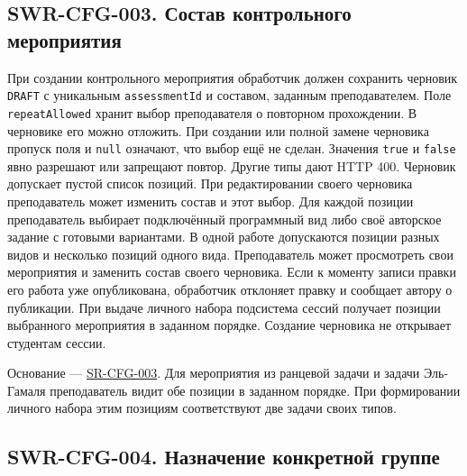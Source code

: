 \documentclass[12pt,a4paper]{article}
\begin{document}
\subsection{SWR-CFG-003. Состав контрольного мероприятия}\label{swr-cfg-003-ux441ux43eux441ux442ux430ux432-ux43aux43eux43dux442ux440ux43eux43bux44cux43dux43eux433ux43e-ux43cux435ux440ux43eux43fux440ux438ux44fux442ux438ux44f}

\hypertarget{swr-cfg-003-состав-контрольного-мероприятия}{}

\hypertarget{swr-cfg-003}{}

При создании контрольного мероприятия обработчик должен сохранить черновик \texttt{DRAFT} с уникальным \texttt{assessment\allowbreak{}Id} и составом, заданным преподавателем. Поле \texttt{repeat\allowbreak{}Allowed} хранит выбор преподавателя о повторном прохождении. В черновике его можно отложить. При создании или полной замене черновика пропуск поля и \texttt{null} означают, что выбор ещё не сделан. Значения \texttt{true} и \texttt{false} явно разрешают или запрещают повтор. Другие типы дают HTTP 400. Черновик допускает пустой список позиций. При редактировании своего черновика преподаватель может изменить состав и этот выбор. Для каждой позиции преподаватель выбирает подключённый программный вид либо своё авторское задание с готовыми вариантами. В одной работе допускаются позиции разных видов и несколько позиций одного вида. Преподаватель может просмотреть свои мероприятия и заменить состав своего черновика. Если к моменту записи правки его работа уже опубликована, обработчик отклоняет правку и сообщает автору о публикации. При выдаче личного набора подсистема сессий получает позиции выбранного мероприятия в заданном порядке. Создание черновика не открывает студентам сессии.

Основание --- {\href{../04\_Системные\_требования/DOC-05\_Системные\_требования.pdf\#sr-cfg-003}{SR-CFG-003}}. Для мероприятия из ранцевой задачи и задачи Эль-Гамаля преподаватель видит обе позиции в заданном порядке. При формировании личного набора этим позициям соответствуют две задачи своих типов.

\subsection{SWR-CFG-004. Назначение конкретной группе}\label{swr-cfg-004-ux43dux430ux437ux43dux430ux447ux435ux43dux438ux435-ux43aux43eux43dux43aux440ux435ux442ux43dux43eux439-ux433ux440ux443ux43fux43fux435}

\hypertarget{swr-cfg-004-назначение-конкретной-группе}{}
\end{document}

